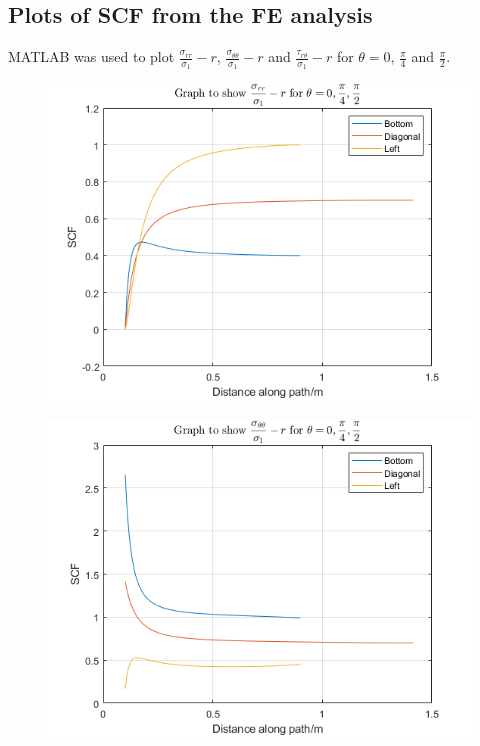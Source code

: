 \documentclass[11pt]{article}
\numberwithin{equation}{section}
\begin{document}
\subsection{Plots of SCF from the FE analysis}
MATLAB was used to plot $\frac{\sigma_{rr}}{\sigma_1} - r$, $\frac{\sigma_{\theta\theta}}{\sigma_1}-r$ and $\frac{\tau_{r\theta}}{\sigma_1}-r$ for $\theta = 0, \, \frac{\pi}{4}$ and $\frac{\pi}{2}$.
\begin{figure}[H]
    \centering
    \begin{minipage}{.5\textwidth}
      \centering
      \includegraphics[width=\linewidth]{./img/diagram7.png}
      \label{fig:sigmarr}
    \end{minipage}%
    \begin{minipage}{.5\textwidth}
      \centering
      \includegraphics[width=\linewidth]{./img/diagram8.png}
      \label{fig:sigmathetatheta}
    \end{minipage}
\end{figure}
\end{document}
